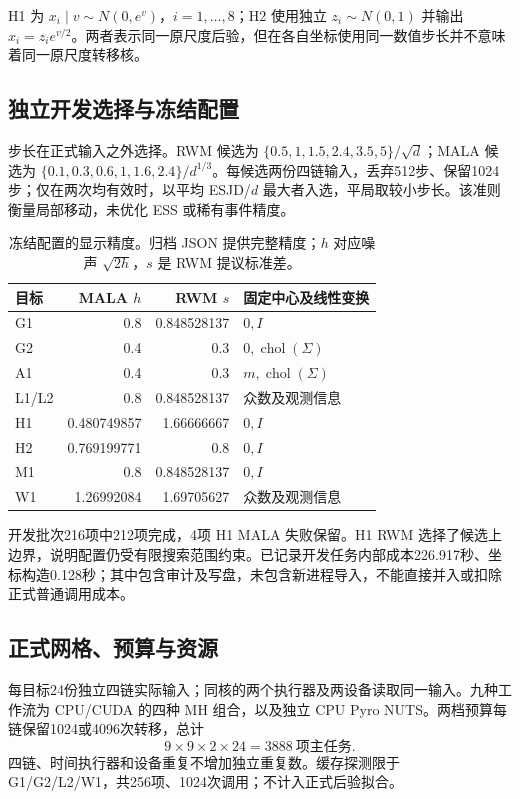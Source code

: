 H1 为 $x_i\mid v\sim N(0,e^v)$，$i=1,\ldots,8$；H2 使用独立 $z_i\sim N(0,1)$ 并输出 $x_i=z_i e^{v/2}$。两者表示同一原尺度后验，但在各自坐标使用同一数值步长并不意味着同一原尺度转移核。

\subsection{独立开发选择与冻结配置}
步长在正式输入之外选择。RWM 候选为 $\{0.5,1,1.5,2.4,3.5,5\}/\sqrt d$；MALA 候选为 $\{0.1,0.3,0.6,1,1.6,2.4\}/d^{1/3}$。每候选两份四链输入，丢弃512步、保留1024步；仅在两次均有效时，以平均 ESJD/$d$ 最大者入选，平局取较小步长。该准则衡量局部移动，未优化 ESS 或稀有事件精度。

\begin{table}[htbp]\centering\smalltable
\begin{tabular}{lrrl}\toprule
目标 & MALA $h$ & RWM $s$ & 固定中心及线性变换\\\midrule
G1 & 0.8 & 0.848528137 & $0,I$\\
G2 & 0.4 & 0.3 & $0,\operatorname{chol}(\Sigma)$\\
A1 & 0.4 & 0.3 & $m,\operatorname{chol}(\Sigma)$\\
L1/L2 & 0.8 & 0.848528137 & 众数及观测信息\\
H1 & 0.480749857 & 1.66666667 & $0,I$\\
H2 & 0.769199771 & 0.8 & $0,I$\\
M1 & 0.8 & 0.848528137 & $0,I$\\
W1 & 1.26992084 & 1.69705627 & 众数及观测信息\\\bottomrule
\end{tabular}
\caption{冻结配置的显示精度。归档 JSON 提供完整精度；$h$ 对应噪声 $\sqrt{2h}$，$s$ 是 RWM 提议标准差。}
\end{table}

开发批次216项中212项完成，4项 H1 MALA 失败保留。H1 RWM 选择了候选上边界，说明配置仍受有限搜索范围约束。已记录开发任务内部成本226.917秒、坐标构造0.128秒；其中包含审计及写盘，未包含新进程导入，不能直接并入或扣除正式普通调用成本。

\subsection{正式网格、预算与资源}
每目标24份独立四链实际输入；同核的两个执行器及两设备读取同一输入。九种工作流为 CPU/CUDA 的四种 MH 组合，以及独立 CPU Pyro NUTS。两档预算每链保留1024或4096次转移，总计
\begin{equation}9\times9\times2\times24=3888\ \text{项主任务}.
\end{equation}
四链、时间执行器和设备重复不增加独立重复数。缓存探测限于 G1/G2/L2/W1，共256项、1024次调用；不计入正式后验拟合。

